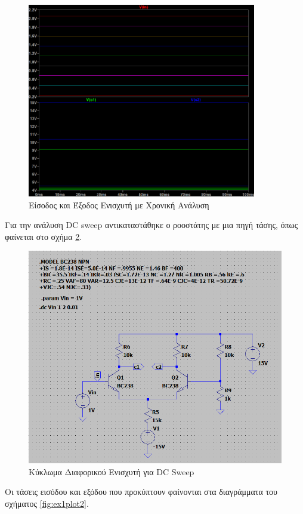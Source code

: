\documentclass[11pt,a4paper,twoside,onecolumn,openright,final]{memoir}
\begin{document}
\begin{figure}[h]
\centerfloat%
\includegraphics[width=10.0cm]{figures/exercise1plot1.png}
\caption{Είσοδος και Έξοδος Ενισχυτή με Χρονική Ανάλυση}\label{fig:ex1plot1}
\end{figure}

Για την ανάλυση DC sweep αντικαταστάθηκε ο ροοστάτης με μια πηγή τάσης, όπως φαίνεται στο σχήμα \ref{fig:ex1circuit2}.

\begin{figure}[h]
\centerfloat%
\includegraphics[width=12.0cm]{figures/exercise1circuit2.png}
\caption{Κύκλωμα Διαφορικού Ενισχυτή για DC Sweep}\label{fig:ex1circuit2}
\end{figure}

Οι τάσεις εισόδου και εξόδου που προκύπτουν φαίνονται στα διαγράμματα του σχήματος \ref{fig:ex1plot2}.
\end{document}
